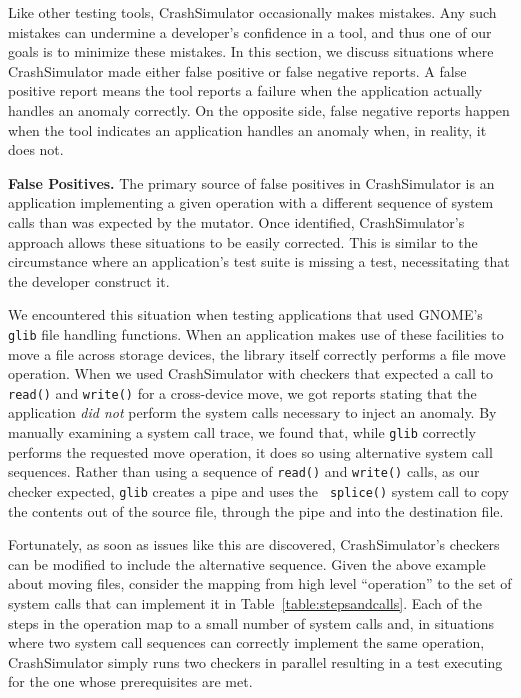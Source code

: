 Like other testing tools, CrashSimulator occasionally makes mistakes.
Any such mistakes can
undermine a developer's confidence in a tool, and thus one of our goals is to minimize these mistakes.   In this section, we discuss
situations where CrashSimulator made either false positive or false
negative reports.  A false positive report means the tool reports
a failure when the application actually handles an anomaly correctly.
On the opposite side, false negative reports happen when the tool indicates an application handles
an anomaly when, in reality, it does not.

\textbf{False Positives.}
The primary source of false positives in CrashSimulator is an application
implementing a given operation with a different sequence of system calls
than was expected by the mutator.
Once identified, CrashSimulator's approach allows these
situations to be easily corrected.
This is similar to the circumstance where an
application's test suite is missing a test, necessitating that the
developer construct it.

We encountered this situation when testing applications that used
GNOME's {\tt glib} file handling functions.  When an
application makes use of these facilities to move a file across storage
devices, the library itself correctly performs a
file move operation.  When we used CrashSimulator with
checkers that expected a call to {\tt read()} and {\tt write()}
for a cross-device move, we got reports stating that the
application {\em did not} perform the system calls necessary to inject
an anomaly.  By manually
examining a system call trace, we found that, while {\tt glib} correctly
performs the requested move operation,
it does so using alternative system call
sequences.  Rather than using a sequence of {\tt read()} and {\tt write()}
calls, as our checker expected, {\tt glib} creates a pipe and uses the {\tt
splice()} system call to copy the contents out of the source file, through
the pipe and into the destination file.

Fortunately, as soon as issues like this are discovered,
CrashSimulator's checkers can be modified to include the alternative
sequence.
Given the above example about moving
files, consider the mapping from high level ``operation'' to the set of
system calls that can implement it in Table~\ref{table:stepsandcalls}.
Each of the steps in the operation map to a small number of system calls
and,
in
situations where two system call sequences can correctly implement the same
operation, CrashSimulator simply runs two checkers in parallel resulting in a
test executing for the one whose prerequisites are met.


